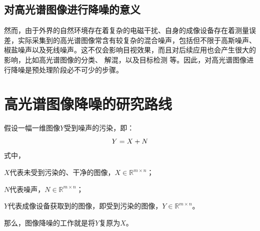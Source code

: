 \documentclass[12pt, a4paper]{article}
\begin{document}
\subsection{对高光谱图像进行降噪的意义}
\par 然而，由于外界的自然环境存在着复杂的电磁干扰、自身的成像设备存在着测量误差，实际采集到的高光谱图像常含有较复杂的混合噪声，包括但不限于高斯噪声、椒盐噪声以及死线噪声。这不仅会影响目视效果，而且对后续应用也会产生很大的影响，比如高光谱图像的分类\cite{further-use-1}、 解混\cite{further-use-2}，以及目标检测\cite{further-use-3} 等。因此，对高光谱图像进行降噪是预处理阶段必不可少的步骤。
\newpage
\section{高光谱图像降噪的研究路线}\label{research-route}
\par 假设一幅一维图像$Y$受到噪声的污染，即：
\begin{equation}
\centering
Y = X + N
\label{ori-equation}
\end{equation}
式中，
\par$X$代表未受到污染的、干净的图像，$X \in \mathbb{R}^{m \times n}$；
\par$N$代表噪声，$N \in \mathbb{R}^{m \times n}$；
\par$Y$代表成像设备获取到的图像，即受到污染的图像，$Y \in \mathbb{R}^{m \times n}$。
\par 那么，图像降噪的工作就是将$Y$复原为$X$。
\end{document}
